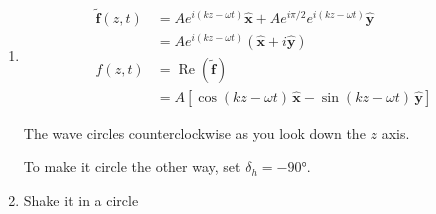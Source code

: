 \documentclass{article}
\renewcommand{\Re}{\operatorname{Re}}
\renewcommand{\vec}[1]{\boldsymbol{\mathbf{#1}}}
\newcommand{\tvec}[1]{\tilde{\vec{#1}}}
\newcommand{\uvec}[1]{\hat{\vec{#1}}}
\begin{document}
\setcounter{subsection}{7}
\subsection{}

\begin{enumerate}
  \item

        \begin{align*}
          \tvec{f}(z, t) & = A e^{i (k z - \omega t)} \uvec{x} + A e^{i \pi / 2} e^{i (k z - \omega t)} \uvec{y} \\
                         & = A e^{i (k z - \omega t)} (\uvec{x} + i \uvec{y})                                    \\
          f(z, t)        & = \Re (\tvec{f})                                                                      \\
                         & = A [\cos (k z - \omega t) \,\uvec{x} - \sin (k z - \omega t) \,\uvec{y}]
        \end{align*}

        The wave circles counterclockwise as you look down the $z$ axis.

        To make it circle the other way, set $\delta_h = \ang{-90}$.

        \setcounter{enumi}{2}
  \item Shake it in a circle
\end{enumerate}
\end{document}
